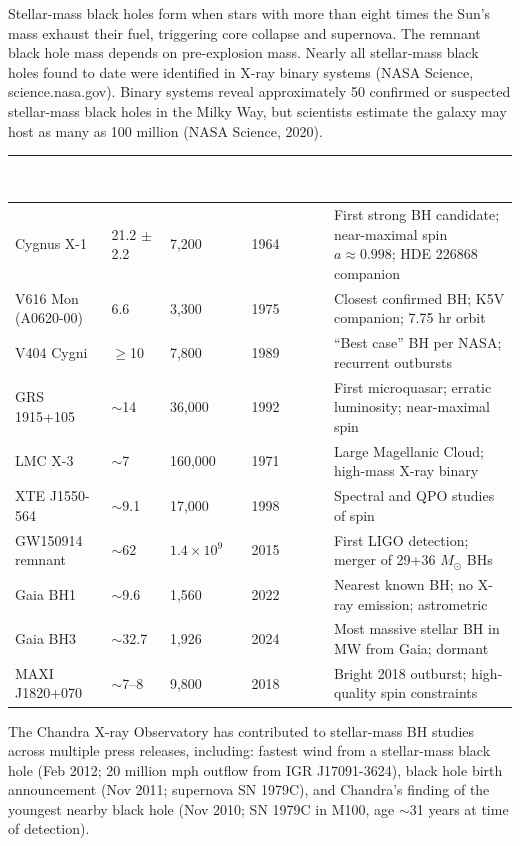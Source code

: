 \documentclass[11pt,letterpaper]{article}
\newcommand{\tableheader}[1]{\textbf{\sffamily\textcolor{white}{#1}}}
\begin{document}
Stellar-mass black holes form when stars with more than eight times the Sun's mass exhaust their fuel, triggering core collapse and supernova. The remnant black hole mass depends on pre-explosion mass. Nearly all stellar-mass black holes found to date were identified in X-ray binary systems (NASA Science, science.nasa.gov). Binary systems reveal approximately 50 confirmed or suspected stellar-mass black holes in the Milky Way, but scientists estimate the galaxy may host as many as 100 million (NASA Science, 2020).

\begin{center}
\begin{tabularx}{\textwidth}{L{2.8cm}C{1.8cm}C{1.8cm}C{2cm}X}
\toprule
{}
\tableheader{Object} & \tableheader{Mass ($M_\odot$)} & \tableheader{Distance (ly)} & \tableheader{Discovery} & \tableheader{Notes} \\
\midrule
Cygnus X-1 & 21.2 $\pm$ 2.2 & 7,200 & 1964 & First strong BH candidate; near-maximal spin $a \approx 0.998$; HDE 226868 companion \\
V616 Mon (A0620-00) & 6.6 & 3,300 & 1975 & Closest confirmed BH; K5V companion; 7.75 hr orbit \\
V404 Cygni & $\geq$10 & 7,800 & 1989 & ``Best case'' BH per NASA; recurrent outbursts \\
GRS 1915+105 & $\sim$14 & 36,000 & 1992 & First microquasar; erratic luminosity; near-maximal spin \\
LMC X-3 & $\sim$7 & 160,000 & 1971 & Large Magellanic Cloud; high-mass X-ray binary \\
XTE J1550-564 & $\sim$9.1 & 17,000 & 1998 & Spectral and QPO studies of spin \\
GW150914 remnant & $\sim$62 & $1.4 \times 10^9$ & 2015 & First LIGO detection; merger of 29+36 $M_\odot$ BHs \\
Gaia BH1 & $\sim$9.6 & 1,560 & 2022 & Nearest known BH; no X-ray emission; astrometric \\
Gaia BH3 & $\sim$32.7 & 1,926 & 2024 & Most massive stellar BH in MW from Gaia; dormant \\
MAXI J1820+070 & $\sim$7--8 & 9,800 & 2018 & Bright 2018 outburst; high-quality spin constraints \\
\bottomrule
\end{tabularx}
\end{center}

The Chandra X-ray Observatory has contributed to stellar-mass BH studies across multiple press releases, including: fastest wind from a stellar-mass black hole (Feb 2012; 20 million mph outflow from IGR J17091-3624), black hole birth announcement (Nov 2011; supernova SN 1979C), and Chandra's finding of the youngest nearby black hole (Nov 2010; SN 1979C in M100, age $\sim$31 years at time of detection).
\end{document}

